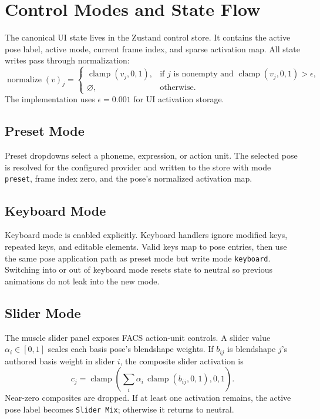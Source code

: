 \documentclass[11pt]{article}
\newcommand{\code}[1]{\texttt{#1}}
\newcommand{\clamp}{\operatorname{clamp}}
\begin{document}
\section{Control Modes and State Flow}

The canonical UI state lives in the Zustand control store.  It contains the active pose label, active mode, current frame index, and sparse activation map.  All state writes pass through normalization:
\begin{equation}
  \operatorname{normalize}(v)_j =
  \begin{cases}
    \clamp(v_j,0,1), & \text{if } j \text{ is nonempty and } \clamp(v_j,0,1)>\epsilon,\\
    \varnothing, & \text{otherwise.}
  \end{cases}
\end{equation}
The implementation uses $\epsilon=0.001$ for UI activation storage.

\subsection{Preset Mode}
Preset dropdowns select a phoneme, expression, or action unit.  The selected pose is resolved for the configured provider and written to the store with mode \code{preset}, frame index zero, and the pose's normalized activation map.

\subsection{Keyboard Mode}
Keyboard mode is enabled explicitly.  Keyboard handlers ignore modified keys, repeated keys, and editable elements.  Valid keys map to pose entries, then use the same pose application path as preset mode but write mode \code{keyboard}.  Switching into or out of keyboard mode resets state to neutral so previous animations do not leak into the new mode.

\subsection{Slider Mode}
The muscle slider panel exposes FACS action-unit controls.  A slider value $\alpha_i \in [0,1]$ scales each basis pose's blendshape weights.  If $b_{ij}$ is blendshape $j$'s authored basis weight in slider $i$, the composite slider activation is
\begin{equation}
  c_j = \clamp\left(\sum_i \alpha_i\,\clamp(b_{ij},0,1), 0, 1\right).
  \label{eq:slider-composition}
\end{equation}
Near-zero composites are dropped.  If at least one activation remains, the active pose label becomes \code{Slider Mix}; otherwise it returns to neutral.
\end{document}
